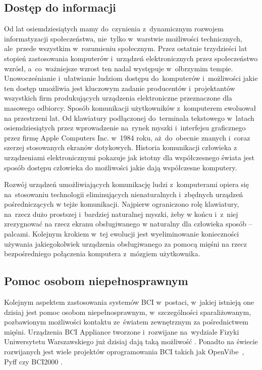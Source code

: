 \documentclass[licencjacka,openright]{pracamgr}
\begin{document}
\subsection{Dostęp do informacji}
Od lat osiemdziesiątych mamy do~czynienia z~dynamicznym rozwojem informatyzacji społeczeństwa, nie~tylko w~warstwie możliwości technicznych, ale~przede wszystkim w~rozumieniu społecznym. Przez ostatnie trzydzieści lat stopień zastosowania komputerów i~urządzeń elektronicznych przez społeczeństwo wzrósł, a~co~ważniejsze wzrost ten nadal występuje w~olbrzymim tempie. Unowocześnianie i~ułatwianie ludziom dostępu do~komputerów i~możliwości jakie ten dostęp umożliwia jest kluczowym zadanie producentów i~projektantów wszystkich firm produkujących urządzenia elektroniczne przeznaczone dla masowego odbiorcy. Sposób komunikacji użytkowników z~komputerem ewoluował na przestrzeni lat. Od klawiatury podłączonej do~terminala tekstowego w~latach osiemdziesiątych przez wprowadzenie na~rynek myszki i~interfejsu graficznego przez firmę Apple Computers Inc. w~1984 roku, aż~do~obecnie znanych i~coraz szerzej stosowanych ekranów dotykowych. Historia komunikacji człowieka z urządzeniami elektronicznymi pokazuje jak istotny dla współczesnego świata jest sposób dostępu człowieka do możliwości jakie dają współczesne komputery.

Rozwój urządzeń umożliwiających komunikację ludzi z~komputerami opiera się na~stosowaniu technologii eliminujących nienaturalnych i~zbędnych urządzeń pośredniczących w tejże komunikacji. Najpierw ograniczono rolę klawiatury, na~rzecz dużo prostszej i~bardziej naturalnej myszki, żeby w końcu i~z~niej zrezygnować na rzecz ekranu obsługiwanego w naturalny dla człowieka sposób -- palcami. Kolejnym krokiem w~tej ewolucji jest wyeliminowanie konieczności używania jakiegokolwiek urządzenia obsługiwanego za pomocą mięśni na rzecz bezpośredniego połączenia komputera z~mózgiem użytkownika.

\subsection{Pomoc osobom niepełnosprawnym}
Kolejnym aspektem zastosowania systemów BCI w~postaci, w~jakiej istnieją one dzisiaj jest pomoc osobom niepełnosprawnym, w~szczególności sparaliżowanym, pozbawionym możliwości kontaktu ze~światem zewnętrznym za pośrednictwem mięśni. Urządzenia BCI Appliance tworzone i~rozwijane na~wydziale Fizyki Uniwersytetu Warszawskiego już dzisiaj dają taką możliwość \citep{obci}.
Ponadto na świecie rozwijanych jest wiele projektów oprogramowania BCI takich jak OpenVibe~\citep{renard2010}, Pyff \citep{venthur2008} czy BCI2000 \citep{schalk2004}.
\end{document}
